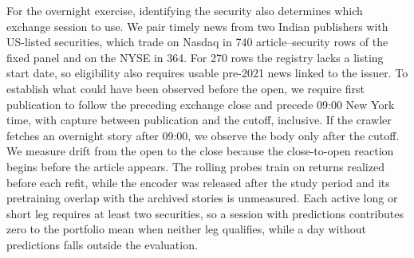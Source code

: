 For the overnight exercise, identifying the security also determines
which exchange session to use. We pair timely news from two Indian
publishers with US-listed securities, which trade on Nasdaq in 740
article--security rows of the fixed panel and on the NYSE in 364.
For 270 rows the registry lacks a
listing start date, so eligibility also requires usable pre-2021 news
linked to the issuer. To establish what could have been observed before
the open, we require first publication to follow the preceding exchange
close and precede 09:00 New York time, with capture between publication
and the cutoff, inclusive. If the crawler fetches an overnight story
after 09:00, we observe the body only after the cutoff. We measure
drift from the open to the close because the close-to-open reaction
begins before the article appears. The
rolling probes train on returns realized before each refit, while
the encoder was released after the study period and its pretraining
overlap with the archived stories is unmeasured. Each active long or
short leg requires at least two
securities, so a session with predictions contributes zero to the
portfolio mean when neither leg qualifies,
while a day without predictions falls outside the evaluation.
